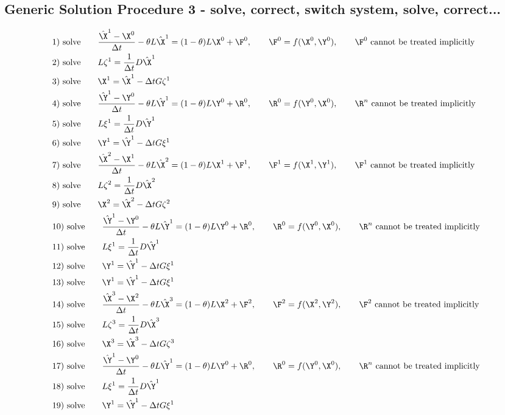 \documentclass[11pt]{article}
\begin{document}
\subsection{Generic Solution Procedure 3 - solve, correct, switch system, solve, correct...}
\footnotesize
\begin{equation}\begin{aligned}
&\text{1)  solve} \qquad \frac{\hat{\X}^{1}-\X^0}{\Delta t} - \theta L\hat{\X}^1 = (1-\theta) L\X^0 + \F^0, \qquad \F^0 = f(\X^0,\Y^0), \qquad \F^0 \text{ cannot be treated implicitly}\\
&\text{2)  solve} \qquad L \zeta^{1} = \frac{1}{\Delta t} D \hat{\X}^1 \\
&\text{3)  solve} \qquad \X^{1} = \hat{\X}^1 - \Delta t G \zeta^{1} \\
&\text{4)  solve} \qquad \frac{\hat{\Y}^{1}-\Y^0}{\Delta t} - \theta L\hat{\Y}^1 = (1-\theta) L\Y^0 + \R^0, \qquad \R^0 = f(\Y^0,\X^0), \qquad \R^n \text{ cannot be treated implicitly} \\
&\text{5)  solve} \qquad L \xi^{1} = \frac{1}{\Delta t} D \hat{\Y}^1 \\
&\text{6)  solve} \qquad \Y^{1} = \hat{\Y}^1 - \Delta t G \xi^{1} \\
&\text{7)  solve} \qquad \frac{\hat{\X}^{2}-\X^1}{\Delta t} - \theta L\hat{\X}^2 = (1-\theta) L\X^1 + \F^1, \qquad \F^1 = f(\X^1,\Y^1), \qquad \F^1 \text{ cannot be treated implicitly}\\
&\text{8)  solve} \qquad L \zeta^{2} = \frac{1}{\Delta t} D \hat{\X}^2 \\
&\text{9)  solve} \qquad \X^{2} = \hat{\X}^2 - \Delta t G \zeta^{2} \\
&\text{10) solve} \qquad \frac{\hat{\Y}^{1}-\Y^0}{\Delta t} - \theta L\hat{\Y}^1 = (1-\theta) L\Y^0 + \R^0, \qquad \R^0 = f(\Y^0,\X^0), \qquad \R^n \text{ cannot be treated implicitly} \\
&\text{11) solve} \qquad L \xi^{1} = \frac{1}{\Delta t} D \hat{\Y}^1 \\
&\text{12) solve} \qquad \Y^{1} = \hat{\Y}^1 - \Delta t G \xi^{1} \\
&\text{13) solve} \qquad \Y^{1} = \hat{\Y}^1 - \Delta t G \xi^{1} \\
&\text{14) solve} \qquad \frac{\hat{\X}^{3}-\X^2}{\Delta t} - \theta L\hat{\X}^3 = (1-\theta) L\X^2 + \F^2, \qquad \F^2 = f(\X^2,\Y^2), \qquad \F^2 \text{ cannot be treated implicitly}\\
&\text{15) solve} \qquad L \zeta^{3} = \frac{1}{\Delta t} D \hat{\X}^3 \\
&\text{16) solve} \qquad \X^{3} = \hat{\X}^3 - \Delta t G \zeta^{3} \\
&\text{17) solve} \qquad \frac{\hat{\Y}^{1}-\Y^0}{\Delta t} - \theta L\hat{\Y}^1 = (1-\theta) L\Y^0 + \R^0, \qquad \R^0 = f(\Y^0,\X^0), \qquad \R^n \text{ cannot be treated implicitly} \\
&\text{18) solve} \qquad L \xi^{1} = \frac{1}{\Delta t} D \hat{\Y}^1 \\
&\text{19) solve} \qquad \Y^{1} = \hat{\Y}^1 - \Delta t G \xi^{1} \\
\end{aligned}\end{equation}
\end{document}
